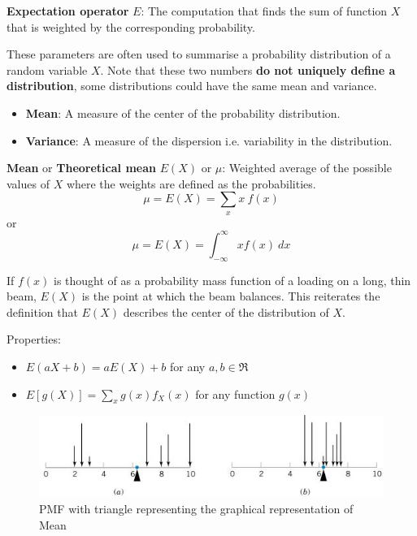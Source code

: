 \documentclass[10pt,a4paper]{article}
\begin{document}
\begin{tcolorbox}[breakable,colback=white]
    \textbf{Expectation operator} $E$: The computation that finds the sum of function
    $X$ that is weighted by the corresponding probability.
\end{tcolorbox}

These parameters are often used to summarise a probability distribution of a random variable $X$.
Note that these two numbers \textbf{do not uniquely define a distribution}, some distributions could
have the same mean and variance.
\begin{itemize}
    \item \textbf{Mean}: A measure of the center of the probability distribution.
    \item \textbf{Variance}: A measure of the dispersion i.e. variability in the distribution.
\end{itemize}

\begin{tcolorbox}[breakable,colback=white]
\textbf{Mean} or \textbf{Theoretical mean} $E(X)$ or $\mu$: Weighted average of the possible values
of $X$ where the weights are defined as the probabilities.
$$
    \mu = E(X) = \sum_x x\:f(x)
$$
or 
$$
    \mu = E(X) = \int_{-\infty}^{\infty}x f(x) \: dx
$$
\end{tcolorbox}

If $f(x)$ is thought of as a probability mass function of a loading on a long, thin beam, $E(X)$ is the
point at which the beam balances. This reiterates the definition that $E(X)$ describes the center of the
distribution of $X$.

Properties:
\begin{itemize}
    \item $E(aX+b)=aE(X)+b$ for any $a,b \in \Re$
    \item $E[g(X)]=\sum_x g(x)f_X(x)$ for any function $g(x)$
\end{itemize}

\begin{figure} [h!]
    \centering
    \includegraphics[]{Mean.JPG}
    \caption{PMF with triangle representing the graphical representation of Mean}
\end{figure}
\end{document}
